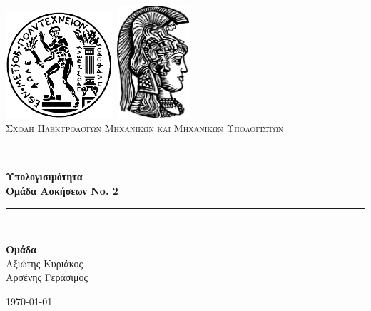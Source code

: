 \newcommand{\HRule}{\rule{\linewidth}{0.5mm}}

\begin{titlepage}
\begin{center}

\includegraphics[width=0.3\textwidth]{../logos/pyrforos.png}
\includegraphics[width=0.2\textwidth]{../logos/uoa.png}\\[1cm]

\textsc{\LARGE Σχολή Ηλεκτρολόγων Μηχανικών και Μηχανικών Υπολογιστών}\\[1.5cm]

\HRule \\[0.4cm]
{\huge \bfseries Υπολογισιμότητα\\
\LARGE Ομάδα Ασκήσεων No. 2}\\[0.4cm]

\HRule \\[1.5cm]

\begin{center}
\textbf{Ομάδα}\\
Αξιώτης Κυριάκος\\
Αρσένης Γεράσιμος
\end{center}

\vfill

{\large \today}
\end{center}

\end{titlepage}
